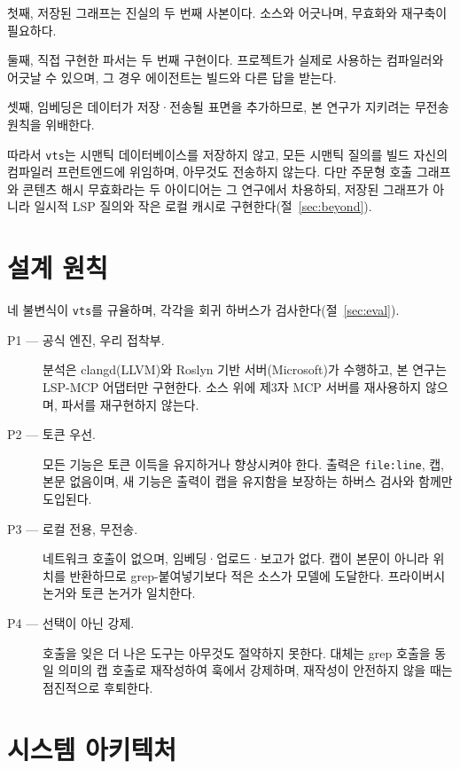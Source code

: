 \documentclass[11pt]{article}
\begin{document}
첫째, 저장된 그래프는 진실의 두 번째 사본이다. 소스와 어긋나며, 무효화와 재구축이 필요하다.

둘째, 직접 구현한 파서는 두 번째 구현이다. 프로젝트가 실제로 사용하는 컴파일러와 어긋날 수
있으며, 그 경우 에이전트는 빌드와 다른 답을 받는다.

셋째, 임베딩은 데이터가 저장·전송될 표면을 추가하므로, 본 연구가 지키려는 무전송 원칙을
위배한다.

따라서 \texttt{vts}는 시맨틱 데이터베이스를 저장하지 않고, 모든 시맨틱 질의를 빌드 자신의
컴파일러 프런트엔드에 위임하며, 아무것도 전송하지 않는다. 다만 주문형 호출 그래프와 콘텐츠
해시 무효화라는 두 아이디어는 그 연구에서 차용하되, 저장된 그래프가 아니라 일시적 LSP 질의와
작은 로컬 캐시로 구현한다(절~\ref{sec:beyond}).

\section{설계 원칙}
\label{sec:principles}

네 불변식이 \texttt{vts}를 규율하며, 각각을 회귀 하버스가 검사한다(절~\ref{sec:eval}).

\begin{description}
  \item[P1 --- 공식 엔진, 우리 접착부.] 분석은 clangd(LLVM)와 Roslyn 기반 서버(Microsoft)가
  수행하고, 본 연구는 LSP-MCP 어댑터만 구현한다. 소스 위에 제3자 MCP 서버를 재사용하지 않으며,
  파서를 재구현하지 않는다.

  \item[P2 --- 토큰 우선.] 모든 기능은 토큰 이득을 유지하거나 향상시켜야 한다. 출력은
  \texttt{file:line}, 캡, 본문 없음이며, 새 기능은 출력이 캡을 유지함을 보장하는 하버스 검사와
  함께만 도입된다.

  \item[P3 --- 로컬 전용, 무전송.] 네트워크 호출이 없으며, 임베딩·업로드·보고가 없다. 캡이
  본문이 아니라 위치를 반환하므로 grep-붙여넣기보다 적은 소스가 모델에 도달한다. 프라이버시
  논거와 토큰 논거가 일치한다.

  \item[P4 --- 선택이 아닌 강제.] 호출을 잊은 더 나은 도구는 아무것도 절약하지 못한다. 대체는
  grep 호출을 동일 의미의 캡 호출로 재작성하여 훅에서 강제하며, 재작성이 안전하지 않을 때는
  점진적으로 후퇴한다.
\end{description}

\section{시스템 아키텍처}
\label{sec:arch}
\end{document}
